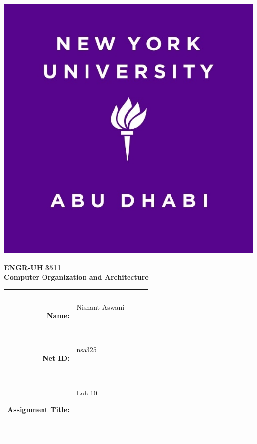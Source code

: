 \documentclass[twocolumn]{article}
\title{\myassignmenttitle}
\author{\myname, \myemail}
\affil{\myclassname (\mycoursenumber), Instructor \myinstructor}
\date{}
\newcommand{\myname}{Nishant Aswani}
\newcommand{\mynetid}{nsa325}
\newcommand{\myhwtype}{Lab }
\newcommand{\myhwnum}{10}
\newcommand{\mycoursenumber}{ENGR-UH 3511}
\newcommand{\myclassname}{Computer Organization and Architecture}
\begin{document}
\onecolumn
\pagestyle{fancy}
\fancyhf{}
\renewcommand{\headrulewidth}{0pt}

\begin{center}
  \includegraphics[scale=0.15]{etc/NYUAD-alt-logo.jpg}
\end{center}

{\vspace{2.5em}}

\begin{center}
    \Huge{\textbf{\mycoursenumber}}\\
    {\vspace{0.5em}}
    \Huge{\textbf{\myclassname}}
\end{center}

{\vspace{10em}}

\begin{center}
  \begin{tabular}{|rp{5.0cm}lll|}
    \hline
    &  &  &  & \\
    &  &  &  & \\
    \Large{\textbf{Name:}} & \Large{\myname}
    
    \  &  &  & \\
    \Large{\textbf{Net ID:}} & \Large{\mynetid}
    
    \  &  &  & \\
    \Large{\textbf{Assignment Title:}} & \Large{\myhwtype \myhwnum}
    
    \
    
    \  &  &  & \\
    \hline
  \end{tabular}
\end{center}
\end{document}
